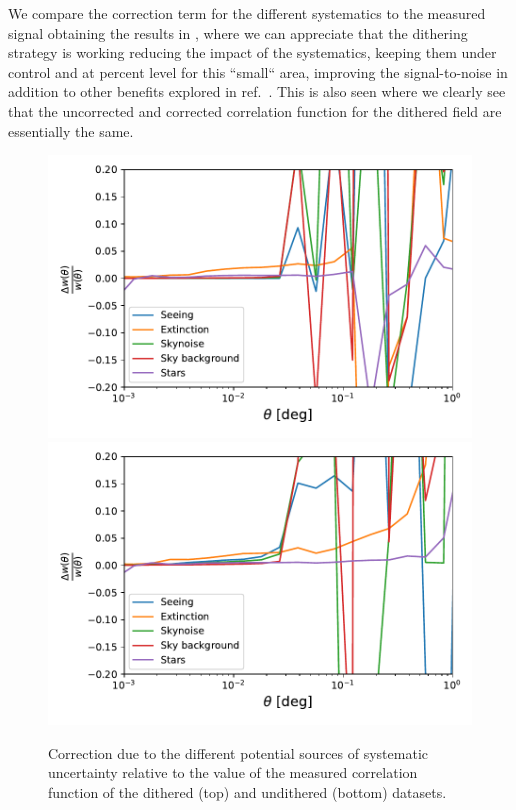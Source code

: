\documentclass[\docopts]{\docclass}
\begin{document}
We compare the correction term for the different systematics to the measured signal obtaining the results in , where we can appreciate that the dithering strategy is working reducing the impact of the systematics, keeping them under control and at percent level for this ``small`` area, improving the signal-to-noise in addition to other benefits explored in ref.~\citep{2016ApJ...829...50A}. This is also seen  where we clearly see that the uncorrected and corrected correlation function for the dithered field are essentially the same.
\begin{figure}
\centering
\includegraphics[width=0.9\columnwidth]{sys_dithered_25p3_v2.pdf}
\includegraphics[width=0.9\columnwidth]{sys_undithered_25p3_v2.pdf}
\caption{Correction due to the different potential sources of systematic uncertainty relative to the value of the measured correlation function of the dithered (top) and undithered (bottom) datasets.}
\label{fig:sys_realspace}
\end{figure}
\end{document}
